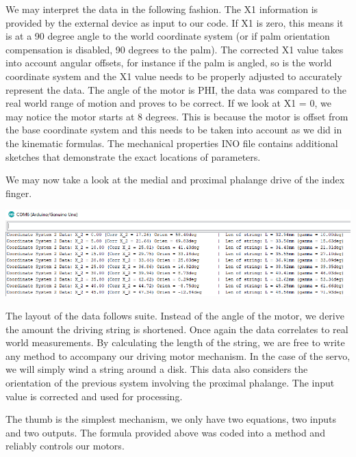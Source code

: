 \documentclass{article}
\begin{document}
We may interpret the data in the following fashion. The X1 information is provided by the external device as input to our code. If X1 is zero, this means it is at a 90 degree angle to the world coordinate system (or if palm orientation compensation is disabled, 90 degrees to the palm). The corrected X1 value takes into account angular offsets, for instance if the palm is angled, so is the world coordinate system and the X1 value needs to be properly adjusted to accurately represent the data. The angle of the motor is PHI, the data was compared to the real world range of motion and proves to be correct. If we look at X1 = 0, we may notice the motor starts at 8 degrees. This is because the motor is offset from the base coordinate system and this needs to be taken into account as we did in the kinematic formulas. The mechanical properties INO file contains additional sketches that demonstrate the exact locations of parameters.

We may now take a look at the medial and proximal phalange drive of the index finger.

\begin{center}
\includegraphics[width=\textwidth]{IMG/IK_03.png}
\end{center}

The layout of the data follows suite. Instead of the angle of the motor, we derive the amount the driving string is shortened. Once again the data correlates to real world measurements. By calculating the length of the string, we are free to write any method to accompany our driving motor mechanism. In the case of the servo, we will simply wind a string around a disk. This data also considers the orientation of the previous system involving the proximal phalange. The input value is corrected and used for processing. 

The thumb is the simplest mechanism, we only have two equations, two inputs and two outputs. The formula provided above was coded into a method and reliably controls our motors.
\end{document}
